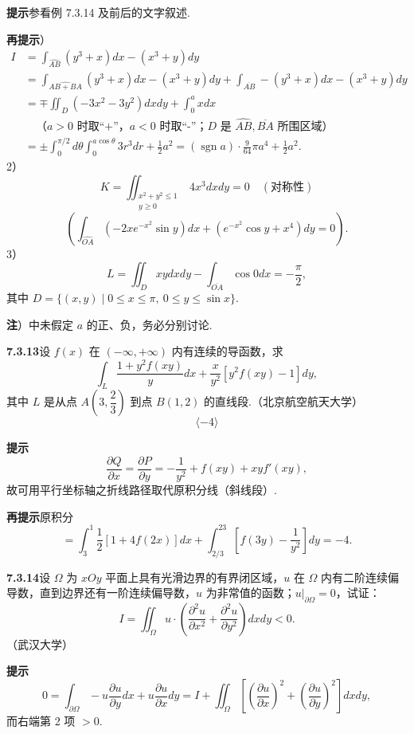 \documentclass[UTF8, 12pt, fontset=fandol, oneside]{ctexart}
\begin{document}
\noindent\textbf{提示}\quad 参看例 7.3.14 及前后的文字叙述.

\noindent\textbf{再提示}）
\[
\begin{aligned}
I&=\int_{\widehat{AB}}(y^3+x)dx-(x^3+y)dy\\
&=\int_{\widehat{AB+BA}}(y^3+x)dx-(x^3+y)dy
+\int_{\overline{AB}}-(y^3+x)dx-(x^3+y)dy\\
&=\mp\iint_D(-3x^2-3y^2)dxdy+\int_0^axdx\\
&\quad\text{（}a>0\text{ 时取“+”，}a<0\text{ 时取“-”；}D\text{ 是 }\widehat{AB},\overline{BA}\text{ 所围区域）}\\
&=\pm\int_0^{\pi/2}d\theta\int_0^{a\cos\theta}3r^3dr+\frac12a^2
=(\operatorname{sgn}a)\cdot\frac9{64}\pi a^4+\frac12a^2.
\end{aligned}
\]
2）
\[
K=\iint_{\substack{x^2+y^2\le1\\y\ge0}}4x^3dxdy=0\quad(\text{对称性})
\]
\[
\left(\int_{\widehat{OA}}(-2xe^{-x^2}\sin y)dx+(e^{-x^2}\cos y+x^4)dy=0\right).
\]
3）
\[
L=\iint_Dxydxdy-\int_{\overline{OA}}\cos0dx=-\frac\pi2,
\]
其中 $D=\{(x,y)\mid0\le x\le\pi,\ 0\le y\le\sin x\}$.

\noindent\textbf{注}）中未假定 $a$ 的正、负，务必分别讨论.

\noindent\textbf{7.3.13}\quad 设 $f(x)$ 在 $(-\infty,+\infty)$ 内有连续的导函数，求
\[
\int_L\frac{1+y^2f(xy)}y dx+\frac x{y^2}[y^2f(xy)-1]dy,
\]
其中 $L$ 是从点 $A\left(3,\dfrac23\right)$ 到点 $B(1,2)$ 的直线段.（北京航空航天大学）
\[
\langle-4\rangle
\]

\noindent\textbf{提示}\quad
\[
\frac{\partial Q}{\partial x}=\frac{\partial P}{\partial y}
=-\frac1{y^2}+f(xy)+xyf'(xy),
\]
故可用平行坐标轴之折线路径取代原积分线（斜线段）.

\noindent\textbf{再提示}\quad 原积分
\[
=\int_3^1\frac12[1+4f(2x)]dx+\int_{2/3}^23\left[f(3y)-\frac1{y^2}\right]dy=-4.
\]

\noindent\textbf{7.3.14}\quad 设 $\Omega$ 为 $xOy$ 平面上具有光滑边界的有界闭区域，$u$ 在 $\Omega$ 内有二阶连续偏导数，直到边界还有一阶连续偏导数，$u$ 为非常值的函数；$u|_{\partial\Omega}=0$，试证：
\[
I=\iint_\Omega u\cdot\left(\frac{\partial^2u}{\partial x^2}
+\frac{\partial^2u}{\partial y^2}\right)dxdy<0.
\]
（武汉大学）

\noindent\textbf{提示}\quad
\[
0=\int_{\partial\Omega}-u\frac{\partial u}{\partial y}dx
+u\frac{\partial u}{\partial x}dy
=I+\iint_\Omega\left[\left(\frac{\partial u}{\partial x}\right)^2
+\left(\frac{\partial u}{\partial y}\right)^2\right]dxdy,
\]
而右端第 2 项 $>0$.
\end{document}
